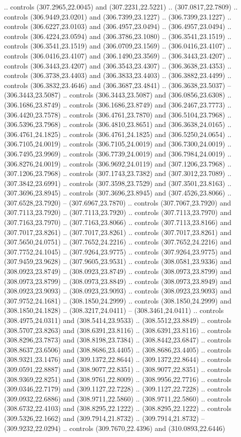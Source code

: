 .. controls (307.2965,22.0045) and (307.2231,22.5221) .. (307.0817,22.7809) .. controls (306.9449,23.0201) and (306.7399,23.1227) .. (306.7399,23.1227) .. controls (306.6227,23.0103) and (306.4957,23.0494) .. (306.4957,23.0494) .. controls (306.4224,23.0594) and (306.3786,23.1080) .. (306.3541,23.1519) .. controls (306.3541,23.1519) and (306.0709,23.1569) .. (306.0416,23.4107) .. controls (306.0416,23.4107) and (306.1490,23.3569) .. (306.3443,23.4207) .. controls (306.3443,23.4207) and (306.3543,23.4307) .. (306.3638,23.4353) .. controls (306.3738,23.4403) and (306.3833,23.4403) .. (306.3882,23.4499) .. controls (306.3832,23.4646) and (306.3687,23.4841) .. (306.3638,23.5037) -- (306.3443,23.5087) .. controls (306.3443,23.5087) and (306.0856,23.6308) .. (306.1686,23.8749) .. controls (306.1686,23.8749) and (306.2467,23.7773) .. (306.4420,23.7578) .. controls (306.4761,23.7870) and (306.5104,23.7968) .. (306.5396,23.7968) .. controls (306.4810,23.8651) and (306.3638,24.0165) .. (306.4761,24.1825) .. controls (306.4761,24.1825) and (306.5250,24.0654) .. (306.7105,24.0019) .. controls (306.7105,24.0019) and (306.7300,24.0019) .. (306.7495,23.9969) .. controls (306.7739,24.0019) and (306.7984,24.0019) .. (306.8276,24.0019) .. controls (306.9692,24.0119) and (307.1206,23.7968) .. (307.1206,23.7968) .. controls (307.1743,23.7382) and (307.3012,23.7089) .. (307.3842,23.6991) .. controls (307.3598,23.7529) and (307.3501,23.8163) .. (307.3696,23.8945) .. controls (307.3696,23.8945) and (307.4526,23.8066) .. (307.6528,23.7920) -- (307.6967,23.7870) .. controls (307.7067,23.7920) and (307.7113,23.7920) .. (307.7113,23.7920) .. controls (307.7113,23.7970) and (307.7163,23.7970) .. (307.7163,23.8066) .. controls (307.7113,23.8166) and (307.7017,23.8261) .. (307.7017,23.8261) .. controls (307.7017,23.8261) and (307.5650,24.0751) .. (307.7652,24.2216) .. controls (307.7652,24.2216) and (307.7752,24.1045) .. (307.9264,23.9775) .. controls (307.9264,23.9775) and (307.9459,23.9628) .. (307.9605,23.9531) .. controls (308.0581,23.9336) and (308.0923,23.8749) .. (308.0923,23.8749) .. controls (308.0973,23.8799) and (308.0973,23.8799) .. (308.0973,23.8849) .. controls (308.0973,23.8949) and (308.0923,23.9093) .. (308.0923,23.9093) .. controls (308.0923,23.9093) and (307.9752,24.1681) .. (308.1850,24.2999) .. controls (308.1850,24.2999) and (308.1850,24.1828) .. (308.3217,24.0411) -- (308.3461,24.0411) .. controls (308.4975,24.0311) and (308.5414,23.9533) .. (308.5512,23.8849) .. controls (308.5707,23.8263) and (308.6391,23.8116) .. (308.6391,23.8116) .. controls (308.8296,23.7873) and (308.8198,23.7384) .. (308.8442,23.6847) .. controls (308.8637,23.6506) and (308.8686,23.4405) .. (308.8686,23.4405) .. controls (308.9321,23.1476) and (309.1372,22.8644) .. (309.1372,22.8644) .. controls (309.0591,22.8887) and (308.9077,22.8351) .. (308.9077,22.8351) .. controls (308.9369,22.8251) and (308.9761,22.8009) .. (308.9956,22.7716) .. controls (309.0346,22.7179) and (309.1127,22.7228) .. (309.1127,22.7228) .. controls (309.0932,22.6886) and (308.9711,22.5860) .. (308.9711,22.5860) .. controls (308.6732,22.4103) and (308.8295,22.1222) .. (308.8295,22.1222) .. controls (309.5326,22.1662) and (309.7914,21.8732) .. (309.7914,21.8732) -- (309.9232,22.0294) .. controls (309.7670,22.4396) and (310.0893,22.6446) 